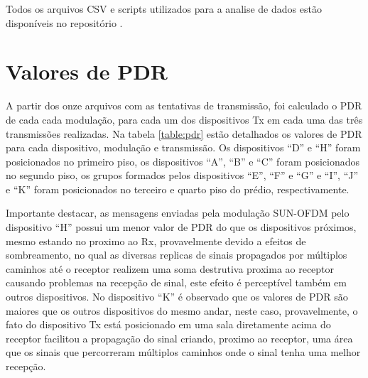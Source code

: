 Todos os arquivos CSV e scripts utilizados para a analise de dados estão disponíveis no repositório \cite{wisun-traces}.

\section{Valores de PDR}
A partir dos onze arquivos com as tentativas de transmissão, foi calculado o PDR de cada cada modulação, para cada um dos dispositivos Tx em cada uma das três transmissões realizadas. Na tabela \ref{table:pdr} estão detalhados os valores de PDR para cada dispositivo, modulação e transmissão. Os dispositivos ``D'' e ``H'' foram posicionados no primeiro piso, os dispositivos ``A'', ``B'' e ``C'' foram posicionados no segundo piso, os grupos formados pelos dispositivos ``E'', ``F'' e ``G'' e ``I'', ``J'' e ``K'' foram posicionados no terceiro e quarto piso do prédio, respectivamente.

Importante destacar, as mensagens enviadas pela modulação SUN-OFDM pelo dispositivo ``H'' possui um menor valor de PDR do que os dispositivos próximos, mesmo estando no proximo ao Rx, provavelmente devido a efeitos de sombreamento, no qual as diversas replicas de sinais propagados por múltiplos caminhos até o receptor realizem uma soma destrutiva proxima ao receptor causando problemas na recepção de sinal, este efeito é perceptível também em outros dispositivos. No dispositivo ``K'' é observado que os valores de PDR são maiores que os outros dispositivos do mesmo andar, neste caso, provavelmente, o fato do dispositivo Tx está posicionado em uma sala diretamente acima do receptor facilitou a propagação do sinal criando, proximo ao receptor, uma área que os sinais que percorreram múltiplos caminhos onde o sinal tenha uma melhor recepção.


